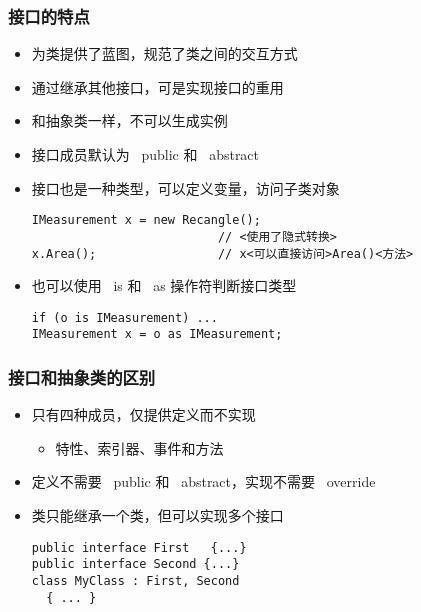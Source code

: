 \begin{frame}[fragile]
\frametitle{接口的特点}
\begin{itemize}
\item 为类提供了蓝图，规范了类之间的交互方式
\item 通过继承其他接口，可是实现接口的重用
\item 和抽象类一样，不可以生成实例
\item 接口成员默认为~ public 和~ abstract
\item 接口也是一种类型，可以定义变量，访问子类对象
\begin{lstlisting}[escapeinside=<>]
IMeasurement x = new Recangle(); 
                          // <使用了隐式转换>
x.Area();                 // x<可以直接访问>Area()<方法>
\end{lstlisting}
\item 也可以使用~ is 和~ as 操作符判断接口类型
\begin{lstlisting}
if (o is IMeasurement) ...
IMeasurement x = o as IMeasurement;
\end{lstlisting}
\end{itemize}
\end{frame}

\begin{frame}[fragile]
\frametitle{接口和抽象类的区别}
\begin{itemize}
\setlength{\itemsep}{8pt plus 1pt}
\item 只有四种成员，仅提供定义而不实现
  \begin{itemize}
  \item 特性、索引器、事件和方法
  \end{itemize}
\item 定义不需要~ public 和~ abstract，实现不需要~ override
\item 类只能继承一个类，但可以实现多个接口

\begin{lstlisting}
public interface First   {...}
public interface Second {...}
class MyClass : First, Second
  { ... }
\end{lstlisting}
\end{itemize}
\end{frame}

